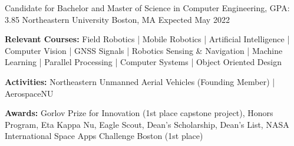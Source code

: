 
\begin{cventries}
  \cventry
    {Candidate for Bachelor and Master of Science in Computer Engineering, GPA: 3.85} %
    {Northeastern University} %
    {Boston, MA} %
    {Expected May 2022} %
    {
      \begin{cvitems} %
         \item {\textbf{Relevant Courses:} Field Robotics | Mobile Robotics | 
         Artificial Intelligence | Computer Vision | GNSS Signals | Robotics Sensing \& Navigation |
          Machine Learning | Parallel Processing | Computer Systems | Object Oriented Design}
         \item {\textbf{Activities:} Northeastern Unmanned Aerial Vehicles (Founding Member) | AerospaceNU}
         \item {\textbf{Awards:} Gorlov Prize for Innovation (1st place capstone project), Honors Program, Eta Kappa Nu, Eagle Scout, Dean's Scholarship, 
         Dean's List, NASA International Space Apps Challenge Boston (1st place)}
      \end{cvitems}
    }
\end{cventries}

